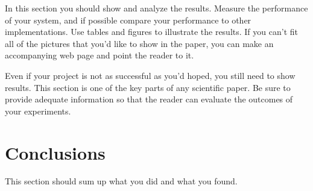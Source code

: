 \documentclass[11pt]{article}
\begin{document}
In this section you should show and analyze the results.  Measure the
performance of your system, and if possible compare your performance
to other implementations. Use tables and figures to illustrate the
results.  If you can't fit all of the pictures that you'd like to show
in the paper, you can make an accompanying web page and point the
reader to it.

Even if your project is not as successful as you'd hoped, you still
need to show results.  This section is one of the key parts of any
scientific paper.  Be sure to provide adequate information so that the
reader can evaluate the outcomes of your experiments.

\section{Conclusions}

This section should sum up what you did and what you found.
\end{document}
